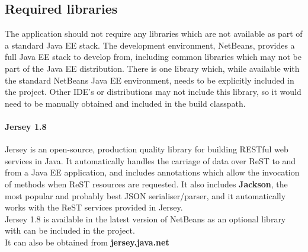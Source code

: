 \subsection{Required libraries}
The application should not require any libraries which are not available as part of a standard Java EE stack. The development environment, NetBeans, provides a full Java EE stack to develop from, including common libraries which may not be part of the Java EE distribution. There is one library which, while available with the standard NetBeans Java EE environment, needs to be explicitly included in the project. Other IDE's or distributions may not include this library, so it would need to be manually obtained and included in the build classpath.
\paragraph{Jersey 1.8}
Jersey is an open-source, production quality library for building RESTful web services in Java. It automatically handles the carriage of data over ReST to and from a Java EE application, and includes annotations which allow the invocation of methods when ReST resources are requested. It also includes \textbf{Jackson}, the most popular and probably best JSON serialiser/parser, and it automatically works with the ReST services provided in Jersey.\\

Jersey 1.8 is available in the latest version of NetBeans as an optional library with can be included in the project.\\

It can also be obtained from \textbf{jersey.java.net}